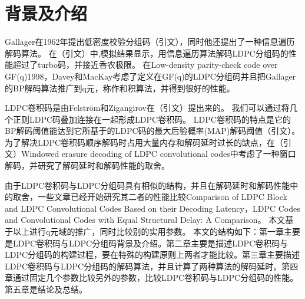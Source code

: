 \chapter{背景及介绍}
Gallager在1962年提出低密度校验分组码（引文），同时他还提出了一种信息遍历解码算法。
在（引文）中,模拟结果显示，用信息遍历算法解码LDPC分组码的性能超过了turbo码，并接近香农极限。
在Low-density parity-check code over GF(q)1998，Davey和MacKay考虑了定义在GF(q)的LDPC分组码并且把Gallager的BP解码算法推广到q元，称作和积算法，并得到很好的性能。

LDPC卷积码是由Felström和Zigangirov在（引文）提出来的。
我们可以通过将几个正则LDPC码叠加连接在一起形成LDPC卷积码。
LDPC卷积码的特点是它的BP解码阈值能达到它所基于的LDPC码的最大后验概率(MAP)解码阈值（引文）。
为了解决LDPC卷积码顺序解码时占用大量内存和解码延时过长的缺点，在（引文）Windowed erasure decoding of LDPC convolutional codes中考虑了一种窗口解码，并研究了解码延时和解码性能的取舍。

由于LDPC卷积码与LDPC分组码具有相似的结构，并且在解码延时和解码性能中的取舍，一些文章已经开始研究其二者的性能比较Comparison of LDPC Block and LDPC Convolutional Codes Based on their Decoding Latency，LDPC Codes and Convolutional Codes with Equal Structural Delay: A Comparison。
本文基于以上进行q元域的推广，同时比较别的实用参数。
本文的结构如下：第一章主要是LDPC卷积码与LDPC分组码背景及介绍。第二章主要是描述LDPC卷积码与LDPC分组码的构建过程，要在特殊的构建原则上两者才能比较。第三章主要描述LDPC卷积码与LDPC分组码的解码算法，并且计算了两种算法的解码延时。第四章通过固定几个参数比较另外的参数，比较LDPC卷积码与LDPC分组码的性能。第五章是结论及总结。
